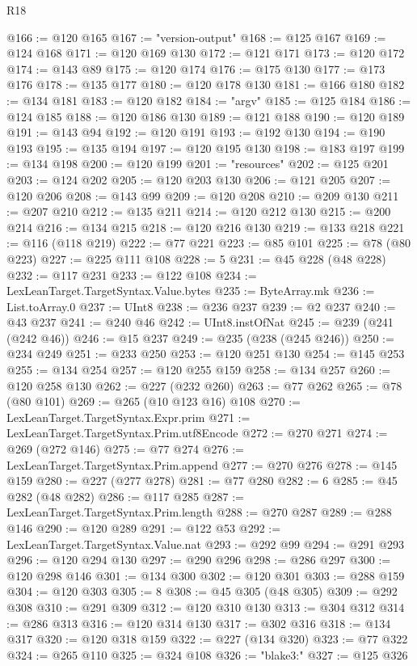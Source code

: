 \begin{lexlean}{R18}
\begin{coremodule}
@166 := @120 @165
@167 := "version-output"
@168 := @125 @167
@169 := @124 @168
@171 := @120 @169 @130
@172 := @121 @171
@173 := @120 @172
@174 := @143 @89
@175 := @120 @174
@176 := @175 @130
@177 := @173 @176
@178 := @135 @177
@180 := @120 @178 @130
@181 := @166 @180
@182 := @134 @181
@183 := @120 @182
@184 := "argv"
@185 := @125 @184
@186 := @124 @185
@188 := @120 @186 @130
@189 := @121 @188
@190 := @120 @189
@191 := @143 @94
@192 := @120 @191
@193 := @192 @130
@194 := @190 @193
@195 := @135 @194
@197 := @120 @195 @130
@198 := @183 @197
@199 := @134 @198
@200 := @120 @199
@201 := "resources"
@202 := @125 @201
@203 := @124 @202
@205 := @120 @203 @130
@206 := @121 @205
@207 := @120 @206
@208 := @143 @99
@209 := @120 @208
@210 := @209 @130
@211 := @207 @210
@212 := @135 @211
@214 := @120 @212 @130
@215 := @200 @214
@216 := @134 @215
@218 := @120 @216 @130
@219 := @133 @218
@221 := @116 (@118 @219)
@222 := @77 @221
@223 := @85 @101
@225 := @78 (@80 @223)
@227 := @225 @111 @108
@228 := 5
@231 := @45 @228 (@48 @228)
@232 := @117 @231
@233 := @122 @108
@234 := LexLeanTarget.TargetSyntax.Value.bytes
@235 := ByteArray.mk
@236 := List.toArray.{0}
@237 := UInt8
@238 := @236 @237
@239 := @2 @237
@240 := @43 @237
@241 := @240 @46
@242 := UInt8.instOfNat
@245 := @239 (@241 (@242 @46))
@246 := @15 @237
@249 := @235 (@238 (@245 @246))
@250 := @234 @249
@251 := @233 @250
@253 := @120 @251 @130
@254 := @145 @253
@255 := @134 @254
@257 := @120 @255 @159
@258 := @134 @257
@260 := @120 @258 @130
@262 := @227 (@232 @260)
@263 := @77 @262
@265 := @78 (@80 @101)
@269 := @265 (@10 @123 @16) @108
@270 := LexLeanTarget.TargetSyntax.Expr.prim
@271 := LexLeanTarget.TargetSyntax.Prim.utf8Encode
@272 := @270 @271
@274 := @269 (@272 @146)
@275 := @77 @274
@276 := LexLeanTarget.TargetSyntax.Prim.append
@277 := @270 @276
@278 := @145 @159
@280 := @227 (@277 @278)
@281 := @77 @280
@282 := 6
@285 := @45 @282 (@48 @282)
@286 := @117 @285
@287 := LexLeanTarget.TargetSyntax.Prim.length
@288 := @270 @287
@289 := @288 @146
@290 := @120 @289
@291 := @122 @53
@292 := LexLeanTarget.TargetSyntax.Value.nat
@293 := @292 @99
@294 := @291 @293
@296 := @120 @294 @130
@297 := @290 @296
@298 := @286 @297
@300 := @120 @298 @146
@301 := @134 @300
@302 := @120 @301
@303 := @288 @159
@304 := @120 @303
@305 := 8
@308 := @45 @305 (@48 @305)
@309 := @292 @308
@310 := @291 @309
@312 := @120 @310 @130
@313 := @304 @312
@314 := @286 @313
@316 := @120 @314 @130
@317 := @302 @316
@318 := @134 @317
@320 := @120 @318 @159
@322 := @227 (@134 @320)
@323 := @77 @322
@324 := @265 @110
@325 := @324 @108
@326 := "blake3:"
@327 := @125 @326

\end{coremodule}
\end{lexlean}
